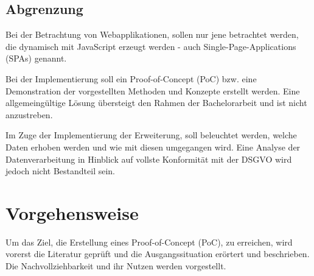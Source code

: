\subsection{Abgrenzung}


Bei der Betrachtung von Webapplikationen, sollen nur jene betrachtet werden, die dynamisch mit JavaScript erzeugt werden - auch Single-Page-Applications (SPAs) genannt.

Bei der Implementierung soll ein Proof-of-Concept (PoC) bzw. eine Demonstration der vorgestellten Methoden und Konzepte erstellt werden. Eine allgemeingültige Lösung übersteigt den Rahmen der Bachelorarbeit und ist nicht anzustreben.


Im Zuge der Implementierung der Erweiterung, soll beleuchtet werden, welche Daten erhoben werden und wie mit diesen umgegangen wird. Eine Analyse der Datenverarbeitung in Hinblick auf vollste Konformität mit der DSGVO wird jedoch nicht Bestandteil sein.

\pagebreak

\section{Vorgehensweise}

Um das Ziel, die Erstellung eines Proof-of-Concept (PoC), zu erreichen, wird vorerst die Literatur geprüft und die Ausgangssituation erörtert und beschrieben. Die Nachvollziehbarkeit und ihr Nutzen werden vorgestellt.


